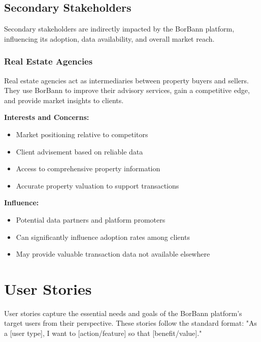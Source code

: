 \subsection{Secondary Stakeholders}

Secondary stakeholders are indirectly impacted by the BorBann platform, influencing its adoption, data availability, and overall market reach.

\subsubsection{Real Estate Agencies}
Real estate agencies act as intermediaries between property buyers and sellers. They use BorBann to improve their advisory services, gain a competitive edge, and provide market insights to clients.

\textbf{Interests and Concerns:}
\begin{itemize}
	\item Market positioning relative to competitors
	\item Client advisement based on reliable data
	\item Access to comprehensive property information
	\item Accurate property valuation to support transactions
\end{itemize}

\textbf{Influence:}
\begin{itemize}
	\item Potential data partners and platform promoters
	\item Can significantly influence adoption rates among clients
	\item May provide valuable transaction data not available elsewhere
\end{itemize}

\section{User Stories}

User stories capture the essential needs and goals of the BorBann platform's target users from their perspective. These stories follow the standard format: "As a [user type], I want to [action/feature] so that [benefit/value]."

